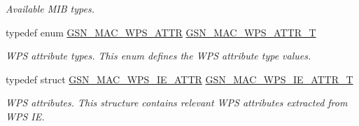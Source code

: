 \begin{DoxyCompactItemize}
\begin{DoxyCompactList}\small\item\em Available MIB types. \end{DoxyCompactList}\item 
typedef enum \hyperlink{a00642_ga0ae19d69a0b381d883890df8a7812414}{GSN\_\-MAC\_\-WPS\_\-ATTR} \hyperlink{a00642_gaabc433282fb88ae2bc9ea6b726e4f049}{GSN\_\-MAC\_\-WPS\_\-ATTR\_\-T}
\begin{DoxyCompactList}\small\item\em WPS attribute types. This enum defines the WPS attribute type values. \end{DoxyCompactList}\item 
typedef struct \hyperlink{a00138}{GSN\_\-MAC\_\-WPS\_\-IE\_\-ATTR} \hyperlink{a00642_gab0287dd9aaabe07cf4313a9d8a14dcca}{GSN\_\-MAC\_\-WPS\_\-IE\_\-ATTR\_\-T}
\begin{DoxyCompactList}\small\item\em WPS attributes. This structure contains relevant WPS attributes extracted from WPS IE. \end{DoxyCompactList}\end{DoxyCompactItemize}
